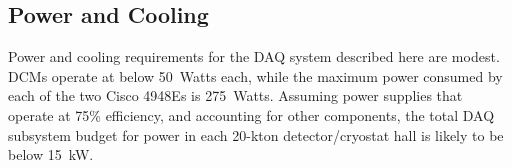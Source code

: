 \subsection{Power and Cooling}

Power and cooling requirements for the DAQ system described here are 
modest.  DCMs operate at below 50~Watts each, while the maximum power 
consumed by each of the two Cisco 4948Es is 275~Watts.  Assuming 
power supplies that operate at 75\% efficiency, and accounting for 
other components, the total DAQ subsystem budget for power 
in each 20-kton detector/cryostat hall is likely to be below 15~kW.


